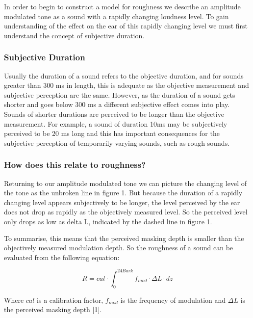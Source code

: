 In order to begin to construct a model for roughness we describe an
amplitude modulated tone as a sound with a rapidly changing loudness
level. To gain understanding of the effect on the ear of this rapidly
changing level we must first understand the concept of subjective
duration.

\subsubsection*{Subjective Duration}\label{subjective-duration}

Usually the duration of a sound refers to the objective duration, and
for sounds greater than 300 ms in length, this is adequate as the
objective measurement and subjective perception are the same. However,
as the duration of a sound gets shorter and goes below 300 ms a
different subjective effect comes into play. Sounds of shorter durations
are perceived to be longer than the objective measurement. For example,
a sound of duration 10ms may be subjectively perceived to be 20 ms long
and this has important consequences for the subjective perception of
temporarily varying sounds, such as rough sounds.

\subsubsection*{How does this relate to
roughness?}\label{how-does-this-relate-to-roughness}

Returning to our amplitude modulated tone we can picture the changing
level of the tone as the unbroken line in figure 1. But because the
duration of a rapidly changing level appears subjectively to be longer,
the level perceived by the ear does not drop as rapidly as the
objectively measured level. So the perceived level only drops as low as
delta L, indicated by the dashed line in figure 1.

\bigskip

To summarise, this means that the perceived masking depth is smaller
than the objectively measured modulation depth. So the roughness of a
sound can be evaluated from the following equation:

\[ R = cal \cdot \int_0^{24Bark}f_{mod} \cdot \Delta L\cdot dz \]


Where $cal$ is a calibration factor, $f_{mod}$ is the frequency of
modulation and $\Delta L$ is the perceived masking depth {[}1{]}.


